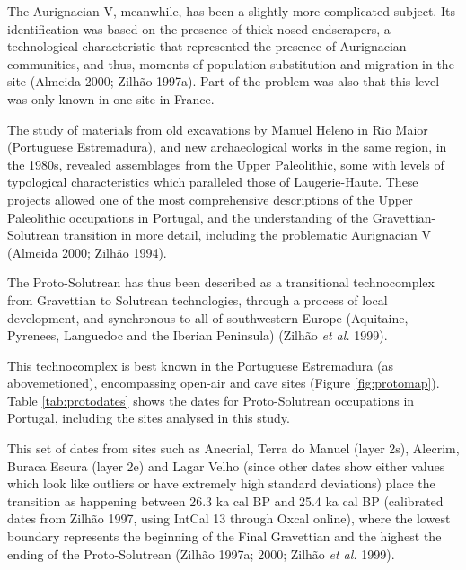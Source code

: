 \documentclass[12pt,twoside]{reedthesis}
\begin{document}
The Aurignacian V, meanwhile, has been a slightly more complicated subject. Its identification was based on the presence of thick-nosed endscrapers, a technological characteristic that represented the presence of Aurignacian communities, and thus, moments of population substitution and migration in the site (Almeida 2000; Zilhão 1997a). Part of the problem was also that this level was only known in one site in France.

The study of materials from old excavations by Manuel Heleno in Rio Maior (Portuguese Estremadura), and new archaeological works in the same region, in the 1980s, revealed assemblages from the Upper Paleolithic, some with levels of typological characteristics which paralleled those of Laugerie-Haute. These projects allowed one of the most comprehensive descriptions of the Upper Paleolithic occupations in Portugal, and the understanding of the Gravettian-Solutrean transition in more detail, including the problematic Aurignacian V (Almeida 2000; Zilhão 1994).

The Proto-Solutrean has thus been described as a transitional technocomplex from Gravettian to Solutrean technologies, through a process of local development, and synchronous to all of southwestern Europe (Aquitaine, Pyrenees, Languedoc and the Iberian Peninsula) (Zilhão \emph{et al.} 1999).

This technocomplex is best known in the Portuguese Estremadura (as abovemetioned), encompassing open-air and cave sites (Figure \ref{fig:protomap}). Table \ref{tab:protodates} shows the dates for Proto-Solutrean occupations in Portugal, including the sites analysed in this study.

This set of dates from sites such as Anecrial, Terra do Manuel (layer 2s), Alecrim, Buraca Escura (layer 2e) and Lagar Velho (since other dates show either values which look like outliers or have extremely high standard deviations) place the transition as happening between 26.3 ka cal BP and 25.4 ka cal BP (calibrated dates from Zilhão 1997, using IntCal 13 through Oxcal online), where the lowest boundary represents the beginning of the Final Gravettian and the highest the ending of the Proto-Solutrean (Zilhão 1997a; 2000; Zilhão \emph{et al.} 1999).
\end{document}
